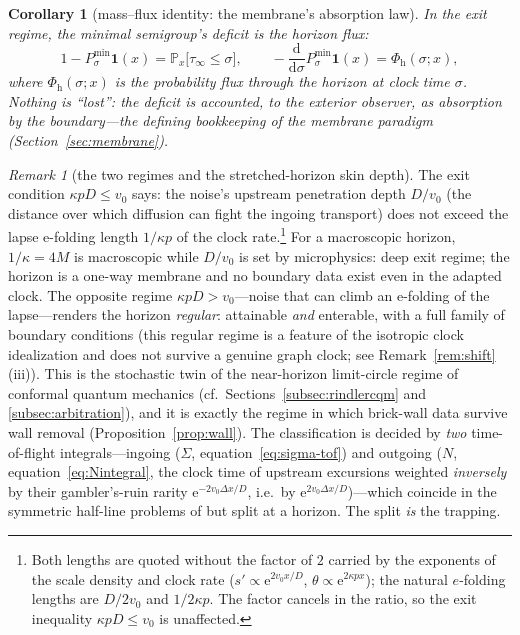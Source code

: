\documentclass[11pt]{article}
\newtheorem{corollary}[theorem]{Corollary}
\theoremstyle{definition}
\theoremstyle{remark}
\newtheorem{remark}[theorem]{Remark}
\newcommand{\ee}{\mathrm{e}}
\newcommand{\dd}{\mathrm{d}}
\begin{document}
\begin{corollary}[mass--flux identity: the membrane's absorption law]
\label{cor:flux}
In the exit regime, the minimal semigroup's deficit is the horizon
flux:
\begin{equation}
1-P^{\min}_{\sigma}\mathbf{1}(x)
=\mathbb{P}_{x}\bigl[\tau_{\infty}\le\sigma\bigr],
\qquad
-\frac{\dd}{\dd\sigma}P^{\min}_{\sigma}\mathbf{1}(x)
=\Phi_{\mathrm{h}}(\sigma;x),
\end{equation}
where $\Phi_{\mathrm{h}}(\sigma;x)$ is the probability flux through
the horizon at clock time $\sigma$. Nothing is ``lost'': the deficit
is accounted, to the exterior observer, as absorption by the
boundary---the defining bookkeeping of the membrane paradigm
(Section~\ref{sec:membrane}).
\end{corollary}

\begin{remark}[the two regimes and the stretched-horizon skin depth]
\label{rem:tworegime}
The exit condition $\kappa pD\le v_{0}$ says: the noise's upstream
penetration depth $D/v_{0}$ (the distance over which diffusion can
fight the ingoing transport) does not exceed the lapse e-folding
length $1/\kappa p$ of the clock rate.\footnote{Both lengths are quoted
without the factor of $2$ carried by the exponents of the scale density
and clock rate ($s'\propto\ee^{2v_{0}x/D}$, $\theta\propto\ee^{2\kappa px}$); the
natural $e$-folding lengths are $D/2v_{0}$ and $1/2\kappa p$. The factor
cancels in the ratio, so the exit inequality $\kappa pD\le v_{0}$ is
unaffected.} For a macroscopic horizon,
$1/\kappa=4M$ is macroscopic while $D/v_{0}$ is set by microphysics:
deep exit regime; the horizon is a one-way membrane and no boundary
data exist even in the adapted clock. The opposite regime
$\kappa pD>v_{0}$---noise that can climb an e-folding of the
lapse---renders the horizon \emph{regular}: attainable \emph{and}
enterable, with a full family of boundary conditions (this regular
regime is a feature of the isotropic clock idealization and does not
survive a genuine graph clock; see Remark~\ref{rem:shift}(iii)). This is the
stochastic twin of the near-horizon limit-circle regime of conformal
quantum mechanics
\cite{GuptaSen2002,CamblongOrdonez2005,Balachandran2018}
(cf.\ Sections~\ref{subsec:rindlercqm} and \ref{subsec:arbitration}),
and it is exactly the regime in which brick-wall data survive wall
removal (Proposition~\ref{prop:wall}). The classification is decided
by \emph{two} time-of-flight integrals---ingoing
($\Sigma$, equation~\eqref{eq:sigma-tof}) and outgoing
($N$, equation~\eqref{eq:Nintegral}, the clock time of upstream
excursions weighted \emph{inversely} by their gambler's-ruin rarity
$\ee^{-2v_{0}\Delta x/D}$, i.e.\ by $\ee^{2v_{0}\Delta x/D}$)---which
coincide in the symmetric half-line
problems of \cite{indivisible} but split at a horizon. The split
\emph{is} the trapping.
\end{remark}
\end{document}

